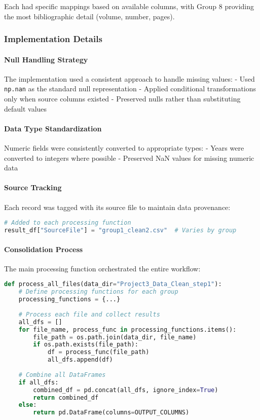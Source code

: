 \documentclass[12pt]{article}
\begin{document}
Each had specific mappings based on available columns, with Group 8
providing the most bibliographic detail (volume, number, pages).

\subsubsection{Implementation Details}\label{implementation-details-1}

\paragraph{Null Handling
Strategy}\label{null-handling-strategy}

The implementation used a consistent approach to handle missing values:
- Used \texttt{np.nan} as the standard null representation - Applied
conditional transformations only when source columns existed - Preserved
nulls rather than substituting default values

\paragraph{Data Type
Standardization}\label{data-type-standardization}

Numeric fields were consistently converted to appropriate types: - Years
were converted to integers where possible - Preserved NaN values for
missing numeric data

\paragraph{Source Tracking}\label{source-tracking}

Each record was tagged with its source file to maintain data provenance:

\begin{lstlisting}[language=Python]
# Added to each processing function
result_df["SourceFile"] = "group1_clean2.csv"  # Varies by group
\end{lstlisting}

\paragraph{Consolidation Process}\label{consolidation-process}

The main processing function orchestrated the entire workflow:

\begin{lstlisting}[language=Python]
def process_all_files(data_dir="Project3_Data_Clean_step1"):
    # Define processing functions for each group
    processing_functions = {...}
    
    # Process each file and collect results
    all_dfs = []
    for file_name, process_func in processing_functions.items():
        file_path = os.path.join(data_dir, file_name)
        if os.path.exists(file_path):
            df = process_func(file_path)
            all_dfs.append(df)
    
    # Combine all DataFrames
    if all_dfs:
        combined_df = pd.concat(all_dfs, ignore_index=True)
        return combined_df
    else:
        return pd.DataFrame(columns=OUTPUT_COLUMNS)
\end{lstlisting}
\end{document}
